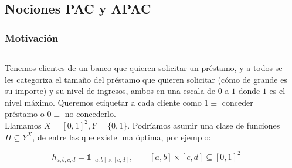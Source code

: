 \subsection{Nociones PAC y APAC}
\begin{frame}\frametitle{Motivación}
\begin{columns}
 \begin{column}{0.45\textwidth}
  \justifying
  Tenemos clientes de un banco que quieren solicitar un préstamo, y a todos se les categoriza
  el tamaño del préstamo que quieren solicitar (cómo de grande es su importe) y su nivel de ingresos, ambos 
  en una escala de $0$ a $1$ donde $1$ es el nivel máximo. Queremos etiquetar a cada cliente como $1\equiv$ conceder préstamo o 
  $0\equiv$ no concederlo.\\
  \bigskip
  Llamamos $X=[0,1]^2, Y=\{0,1\}$. Podríamos asumir una clase de funciones $H \subseteq Y^X$, de entre las que existe
  una óptima, por ejemplo:

  \[h_{a,b,c,d} = \mathds{1}_{[a,b]\times[c,d]}, \qquad [a,b]\times [c,d] \subseteq [0,1]^2\]
 \end{column}
 \begin{column}{0.55\textwidth}
 \end{column}
\end{columns}
\end{frame}

